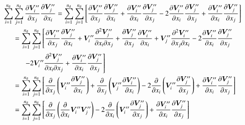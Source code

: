 \documentclass{warpdoc}
\newcommand{\alb}{\vspace{0.2cm}\\} %
\newcommand{\nd}{{{n}_{\rm d}}}
\newcommand{\mfd}{\displaystyle}
\begin{document}
\begin{align*}
  \sum_{i=1}^\nd &\sum_{j=1}^\nd \frac{\partial \bm{V}_i^{{\prime\prime}}}{\partial x_j}  \frac{\partial \bm{V}_j^{{\prime\prime}}}{\partial x_i}
      = \mfd\sum_{i=1}^\nd \sum_{j=1}^\nd \left[
         \frac{\partial \bm{V}_i^{{\prime\prime}}}{\partial x_j} \frac{\partial \bm{V}_j^{{\prime\prime}}}{\partial x_i}
        +\frac{\partial \bm{V}_i^{{\prime\prime}}}{\partial x_i} \frac{\partial \bm{V}_j^{{\prime\prime}}}{\partial x_j}
       -2\frac{\partial \bm{V}_i^{{\prime\prime}}}{\partial x_i} \frac{\partial \bm{V}_j^{{\prime\prime}}}{\partial x_j}
        +\frac{\partial \bm{V}_i^{{\prime\prime}}}{\partial x_i}  \frac{\partial \bm{V}_j^{{\prime\prime}}}{\partial x_j}
       \right]\alb
     &=\sum_{i=1}^\nd \sum_{j=1}^\nd \left[
         \frac{\partial \bm{V}_i^{{\prime\prime}}}{\partial x_j} \frac{\partial \bm{V}_j^{{\prime\prime}}}{\partial x_i}
        +\bm{V}_i^{{\prime\prime}}\frac{\partial^2 \bm{V}_j^{{\prime\prime}}}{\partial x_i \partial x_j}
        +\frac{\partial \bm{V}_j^{{\prime\prime}}}{\partial x_j} \frac{\partial \bm{V}_i^{{\prime\prime}}}{\partial x_i}
        +\bm{V}_j^{{\prime\prime}}\frac{\partial^2 \bm{V}_i^{{\prime\prime}} }{\partial x_j \partial x_i}
       -2\frac{\partial \bm{V}_i^{{\prime\prime}}}{\partial x_i} \frac{\partial \bm{V}_j^{{\prime\prime}}}{\partial x_j}
        \right.\alb
     &~~~~~~\left.
       -2 \bm{V}_i^{{\prime\prime}}  \frac{\partial^2 \bm{V}_j^{{\prime\prime}}}{\partial x_i \partial x_j}
        +\frac{\partial \bm{V}_i^{{\prime\prime}}}{\partial x_i}  \frac{\partial \bm{V}_j^{{\prime\prime}}}{\partial x_j}
       \right]\alb
     &= \mfd\sum_{i=1}^\nd \sum_{j=1}^\nd \left[
         \frac{\partial }{\partial x_j} \left( \bm{V}_i^{{\prime\prime}} \frac{\partial \bm{V}_j^{{\prime\prime}}}{\partial x_i} \right)
        +\frac{\partial }{\partial x_j} \left( \bm{V}_j^{{\prime\prime}} \frac{\partial \bm{V}_i^{{\prime\prime}}}{\partial x_i} \right)
       -2\frac{\partial }{\partial x_i} \left( \bm{V}_i^{{\prime\prime}} \frac{\partial \bm{V}_j^{{\prime\prime}}}{\partial x_j}   \right)
        +\frac{\partial \bm{V}_i^{{\prime\prime}}}{\partial x_i}  \frac{\partial \bm{V}_j^{{\prime\prime}}}{\partial x_j}
       \right]\alb
     &= \mfd\sum_{i=1}^\nd \sum_{j=1}^\nd \left[
         \frac{\partial }{\partial x_j} \left( \frac{\partial}{\partial x_i}\bm{V}_i^{{\prime\prime}}  \bm{V}_j^{{\prime\prime}}\right)
       -2\frac{\partial }{\partial x_i} \left( \bm{V}_i^{{\prime\prime}} \frac{\partial \bm{V}_j^{{\prime\prime}}}{\partial x_j}   \right)
        +\frac{\partial \bm{V}_i^{{\prime\prime}}}{\partial x_i}  \frac{\partial \bm{V}_j^{{\prime\prime}}}{\partial x_j}
       \right]
\end{align*}
\end{document}

